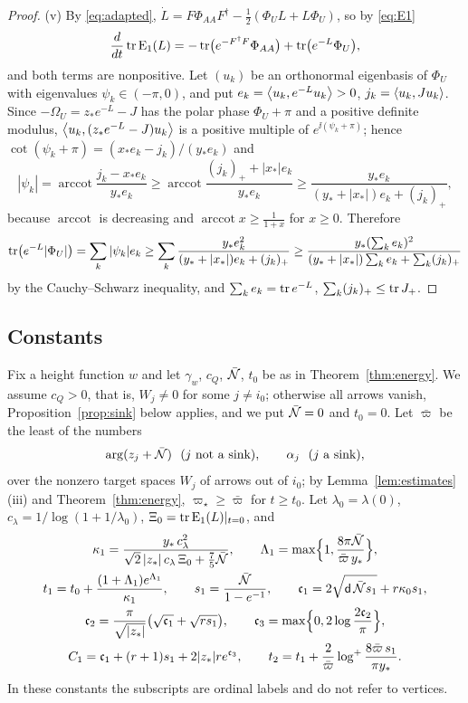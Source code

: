 \begin{proof}
(v) By \eqref{eq:adapted},
$\dot L=F\Phi_{AA}F^\dagger-\frac12(\Phi_UL+L\Phi_U)$, so by \eqref{eq:E1}
\[
 \frac d{dt}\operatorname{tr}\mathrm E_1(L)=-\operatorname{tr}\bigl(e^{-F^\dagger F}\Phi_{AA}\bigr)+\operatorname{tr}\bigl(e^{-L}\Phi_U\bigr),
\]
and both terms are nonpositive. Let $(u_k)$ be an orthonormal eigenbasis of
$\Phi_U$ with eigenvalues $\psi_k\in(-\pi,0)$, and put
$e_k=\left\langle u_k,e^{-L}u_k\right\rangle>0$, $j_k=\left\langle u_k,Ju_k\right\rangle$. Since
$-\Omega_U=z_\ast e^{-L}-J$ has the polar phase $\Phi_U+\pi$ and a positive
definite modulus, $\left\langle u_k,(z_\ast e^{-L}-J)u_k\right\rangle$ is a positive multiple
of $e^{\ii(\psi_k+\pi)}$; hence
$\cot(\psi_k+\pi)=(x_\ast e_k-j_k)/(y_\ast e_k)$ and
\[
 |\psi_k|=\operatorname{arccot}\frac{j_k-x_\ast e_k}{y_\ast e_k}
 \geq\operatorname{arccot}\frac{(j_k)_++|x_\ast|e_k}{y_\ast e_k}
 \geq\frac{y_\ast e_k}{(y_\ast+|x_\ast|)e_k+(j_k)_+},
\]
because $\operatorname{arccot}$ is decreasing and
$\operatorname{arccot}x\geq\frac1{1+x}$ for $x\geq0$. Therefore
\[
 \operatorname{tr}\bigl(e^{-L}|\Phi_U|\bigr)=\sum_k|\psi_k|e_k
 \geq\sum_k\frac{y_\ast e_k^2}{(y_\ast+|x_\ast|)e_k+(j_k)_+}
 \geq\frac{y_\ast(\sum_ke_k)^2}{(y_\ast+|x_\ast|)\sum_ke_k+\sum_k(j_k)_+}
\]
by the Cauchy--Schwarz inequality, and $\sum_ke_k=\operatorname{tr} e^{-L}$,
$\sum_k(j_k)_+\leq\operatorname{tr} J_+$.
\end{proof}

\subsection{Constants}
Fix a height function $w$ and let $\gamma_w$, $c_Q$, $\bar{\mathcal N}$, $t_0$ be as in
Theorem~\ref{thm:energy}. We assume $c_Q>0$, that is, $W_j\neq0$ for some
$j\neq i_0$; otherwise all arrows vanish, Proposition~\ref{prop:sink} below
applies, and we put $\bar{\mathcal N}=0$ and $t_0=0$. Let $\bar\varpi$ be the least of the
numbers
\[
 \arg(z_j+\bar{\mathcal N})\ \ (j\text{ not a sink}),\qquad\alpha_j\ \ (j\text{ a sink}),
\]
over the nonzero target spaces $W_j$ of arrows out of $i_0$; by
Lemma~\ref{lem:estimates}(iii) and Theorem~\ref{thm:energy},
$\varpi_\star\geq\bar\varpi$ for $t\geq t_0$. Let $\lambda_0=\lambda(0)$,
$c_\lambda=1/\log(1+1/\lambda_0)$, $\Xi_0=\operatorname{tr}\mathrm E_1(L)|_{t=0}$, and
\begin{equation}\label{eq:constants}
 \begin{gathered}
 \kappa_1=\frac{y_\ast\,c_\lambda^2}{\sqrt2\,|z_\ast|\,c_\lambda\,\Xi_0+\frac75\bar{\mathcal N}},\qquad
 \Lambda_1=\max\Bigl\{1,\frac{8\pi\bar{\mathcal N}}{\bar\varpi\,y_\ast}\Bigr\},\\
 t_1=t_0+\frac{(1+\Lambda_1)e^{\Lambda_1}}{\kappa_1},\qquad
 s_1=\frac{\bar{\mathcal N}}{1-e^{-1}},\qquad
 \mathfrak c_1=2\sqrt{\mathsf d\,\bar{\mathcal N} s_1}+r\kappa_0s_1,\\
 \mathfrak c_2=\frac\pi{\sqrt{|z_\ast|}}\bigl(\sqrt{\mathfrak c_1}+\sqrt{rs_1}\bigr),\qquad
 \mathfrak c_3=\max\Bigl\{0,2\log\frac{2\mathfrak c_2}\pi\Bigr\},\\
 C_1=\mathfrak c_1+(r+1)s_1+2|z_\ast|re^{\mathfrak c_3},\qquad
 t_2=t_1+\frac2{\bar\varpi}\log^+\frac{8\bar\varpi\,s_1}{\pi y_\ast}.
 \end{gathered}
\end{equation}
In these constants the subscripts are ordinal labels and do not refer to
vertices.

